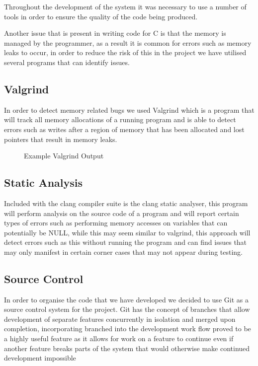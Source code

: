 Throughout the development of the system it was necessary to use a number of tools in order to ensure the
quality of the code being produced.

Another issue that is present in writing code for C is that the memory is managed by the programmer, as a
result it is common for errors such as memory leaks to occur, in order to reduce the risk of this in the project
we have utilised several programs that can identify issues.

\subsection{Valgrind}
In order to detect memory related bugs we used Valgrind which is a program that will track all memory allocations
of a running program and is able to detect errors such as writes after a region of memory that has been allocated
and lost pointers that result in memory leaks.

\begin{figure}

\label{fig:valgrind_listing}
\caption{Example Valgrind Output}
\end{figure}

\subsection{Static Analysis}
Included with the clang compiler suite is the clang static analyser, this program will perform analysis on the
source code of a program and will report certain types of errors such as performing memory accesses on variables
that can potentially be NULL, while this may seem similar to valgrind, this approach will detect errors such
as this without running the program and can find issues that may only manifest in certain corner cases that
may not appear during testing.

\subsection{Source Control}
In order to organise the code that we have developed we decided to use Git as a source control system for the project.
Git has the concept of branches that allow development of separate features concurrently in isolation and
merged upon completion, incorporating branched into the development work flow proved to be a highly useful feature
as it allows for work on a feature to continue even if another feature breaks parts of the system that would
otherwise make continued development impossible

